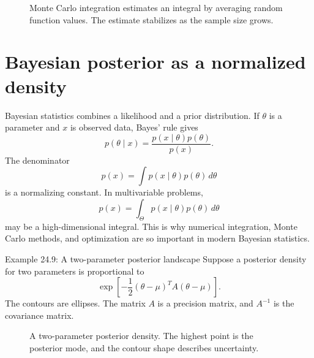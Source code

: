 \documentclass[11pt,oneside]{book}
\newcommand{\dd}{\,d}
\begin{document}
\begin{figure}[H]
\centering
{}
\caption{Monte Carlo integration estimates an integral by averaging random function values. The estimate stabilizes as the sample size grows.}
\end{figure}

\section{Bayesian posterior as a normalized density}

Bayesian statistics combines a likelihood and a prior distribution. If $\theta$ is a parameter and $x$ is observed data, Bayes' rule gives
\[
p(\theta\mid x)=\frac{p(x\mid\theta)p(\theta)}{p(x)}.
\]
The denominator
\[
p(x)=\int p(x\mid\theta)p(\theta)\dd\theta
\]
is a normalizing constant. In multivariable problems,
\[
p(x)=\int_{\Theta}p(x\mid\theta)p(\theta)\dd\theta
\]
may be a high-dimensional integral. This is why numerical integration, Monte Carlo methods, and optimization are so important in modern Bayesian statistics.

\begin{examplebox}{Example 24.9: A two-parameter posterior landscape}
Suppose a posterior density for two parameters is proportional to
\[
\exp\left[-\frac12(\theta-\mu)^TA(\theta-\mu)\right].
\]
The contours are ellipses. The matrix $A$ is a precision matrix, and $A^{-1}$ is the covariance matrix.
\end{examplebox}

\begin{figure}[H]
\centering
{}
\caption{A two-parameter posterior density. The highest point is the posterior mode, and the contour shape describes uncertainty.}
\end{figure}
\end{document}
